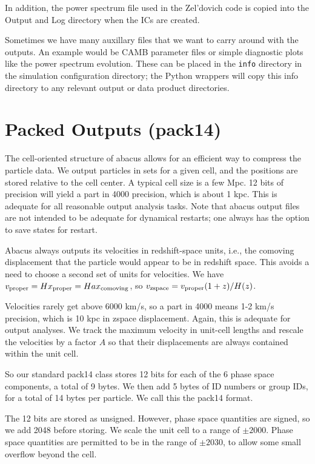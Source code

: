 \documentclass[11pt,preprint]{aastex}
\begin{document}
In addition, the power spectrum file used in the Zel'dovich code
is copied into the Output and Log directory when the ICs are created.

Sometimes we have many auxillary files that we want to carry around
with the outputs.  An example would be CAMB parameter files or simple
diagnostic plots like the power spectrum evolution.  These can be placed
in the \verb|info| directory in the simulation configuration directory;
the Python wrappers will copy this info directory to any relevant
output or data product directories.

\section{Packed Outputs (pack14)}\label{sec:pack14}

The cell-oriented structure of abacus allows for an efficient way
to compress the particle data.  We output particles in sets for a
given cell, and the positions are stored relative to the cell center.
A typical cell size is a few Mpc.  12 bits of precision will yield
a part in 4000 precision, which is about 1 kpc.  This is adequate
for all reasonable output analysis tasks.  Note that abacus output
files are not intended to be adequate for dynamical restarts; one
always has the option to save states for restart.

Abacus always outputs its velocities in redshift-space units, i.e.,
the comoving displacement that the particle would appear to be in
redshift space.  This avoids a need to choose a second set of units
for velocities.  We have $v_{\rm proper} = Hx_{\rm proper} =
Hax_{\rm comoving}$, so $v_{\rm zspace} = v_{\rm proper}(1+z)/H(z)$.

Velocities rarely get above 6000 km/s, so a part in 4000 means 1-2
km/s precision, which is 10 kpc in zspace displacement.  Again, this
is adequate for output analyses.  We track the maximum velocity 
in unit-cell lengths and rescale the velocities by a factor $A$ 
so that their displacements are always contained within the unit cell.

So our standard pack14 class stores 12 bits for each of the 6 phase
space components, a total of 9 bytes.  We then add 5 bytes of ID
numbers or group IDs, for a total of 14 bytes per particle.  We call
this the pack14 format.

The 12 bits are stored as unsigned.  However, phase space quantities
are signed, so we add 2048 before storing.  We scale the unit cell 
to a range of $\pm2000$.  Phase space quantities are permitted to 
be in the range of $\pm2030$, to allow some small overflow beyond 
the cell.
\end{document}
